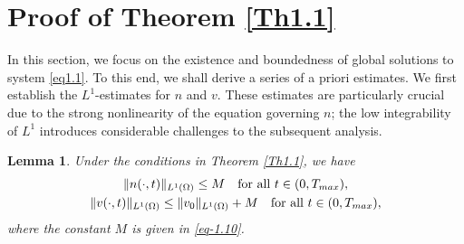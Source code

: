 \documentclass[10pt,a4paper]{amsart}
\numberwithin{equation}{section}
\newtheorem{lemma}[theo]{Lemma}
\begin{document}
\section{Proof of Theorem \ref{Th1.1}}

In this section, we focus on the existence and boundedness of global  solutions 
to system \eqref{eq1.1}. To this end, we shall derive a series of a priori estimates.
We first establish the \(L^1\)-estimates for \(n\) and \(v\). These estimates are 
particularly crucial due to the strong nonlinearity of the equation governing \(n\); 
the low integrability of \(L^1\) introduces considerable challenges to the subsequent 
analysis.

\begin{lemma}\label{lem3.1}
Under the conditions in Theorem \ref{Th1.1}, we have
\begin{gather}\label{10.20-3}
\|n(\cdot,t)\|_{L^1(\Omega)} \leq M \quad \text{for all } t \in (0, T_{\rm max}), \\
\label{eq-3.2}
\|v(\cdot,t)\|_{L^1(\Omega)} \leq \|v_0\|_{L^1(\Omega)}+M  
\quad \text{for all } t \in (0, T_{\rm max}),
\end{gather}
where the constant $M$ is given in \eqref{eq-1.10}.
\end{lemma}
\end{document}
